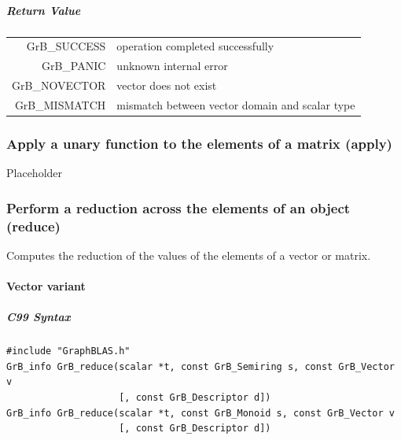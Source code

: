 \documentclass[11pt]{extarticle}
\begin{document}
\subparagraph{Return Value}

\begin{tabular}{rl}
{\sf GrB\_SUCCESS}	& operation completed successfully \\
{\sf GrB\_PANIC}	& unknown internal error \\
{\sf GrB\_NOVECTOR}	& vector does not exist \\
{\sf GrB\_MISMATCH}	& mismatch between vector domain and scalar type \\
\end{tabular}

\subsubsection{Apply a unary function to the elements of a matrix ({\sf apply})}

Placeholder

\subsubsection{Perform a reduction across the elements of an object ({\sf reduce})}

Computes the reduction of the values of the elements of a vector or matrix.

\paragraph{Vector variant}

\subparagraph{C99 Syntax}

\begin{verbatim}
#include "GraphBLAS.h"
GrB_info GrB_reduce(scalar *t, const GrB_Semiring s, const GrB_Vector v
                    [, const GrB_Descriptor d])
GrB_info GrB_reduce(scalar *t, const GrB_Monoid s, const GrB_Vector v
                    [, const GrB_Descriptor d])
\end{verbatim}


\end{document}

